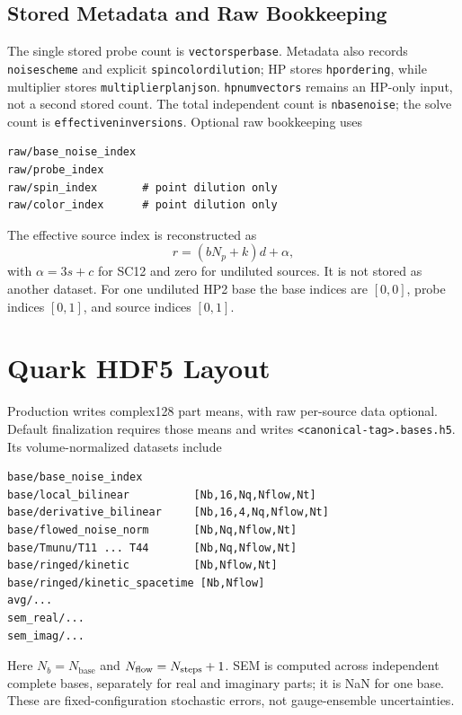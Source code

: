 \documentclass[11pt,a4paper]{article}
\newcommand{\code}[1]{\texttt{\begingroup\def\_{\textunderscore\allowbreak}#1\endgroup}}
\begin{document}
\subsection{Stored Metadata and Raw Bookkeeping}

The single stored probe count is \code{vectors\_per\_base}. Metadata also
records \code{noise\_scheme} and explicit \code{spin\_color\_dilution}; HP
stores \code{hp\_ordering}, while multiplier stores
\code{multiplier\_plan\_json}. \code{hp\_num\_vectors} remains an HP-only
input, not a second stored count. The total independent count is
\code{n\_base\_noise}; the solve count is \code{effective\_n\_inversions}.
Optional raw bookkeeping uses
\begin{verbatim}
raw/base_noise_index
raw/probe_index
raw/spin_index       # point dilution only
raw/color_index      # point dilution only
\end{verbatim}
The effective source index is reconstructed as
\begin{equation}
 r=(bN_p+k)d+\alpha,
\end{equation}
with \(\alpha=3s+c\) for SC12 and zero for undiluted sources. It is not stored
as another dataset. For one undiluted HP2 base the base indices are \([0,0]\),
probe indices \([0,1]\), and source indices \([0,1]\).

\section{Quark HDF5 Layout}

Production writes complex128 part means, with raw per-source data optional.
Default finalization requires those means and writes
\code{<canonical-tag>.bases.h5}. Its volume-normalized datasets include
\begin{verbatim}
base/base_noise_index
base/local_bilinear          [Nb,16,Nq,Nflow,Nt]
base/derivative_bilinear     [Nb,16,4,Nq,Nflow,Nt]
base/flowed_noise_norm       [Nb,Nq,Nflow,Nt]
base/Tmunu/T11 ... T44       [Nb,Nq,Nflow,Nt]
base/ringed/kinetic          [Nb,Nflow,Nt]
base/ringed/kinetic_spacetime [Nb,Nflow]
avg/...
sem_real/...
sem_imag/...
\end{verbatim}
Here \(N_b=N_{\mathrm{base}}\) and \(N_{\rm flow}=N_{\rm steps}+1\).
SEM is computed across independent complete bases, separately for real and
imaginary parts; it is NaN for one base. These are fixed-configuration
stochastic errors, not gauge-ensemble uncertainties.
\end{document}
